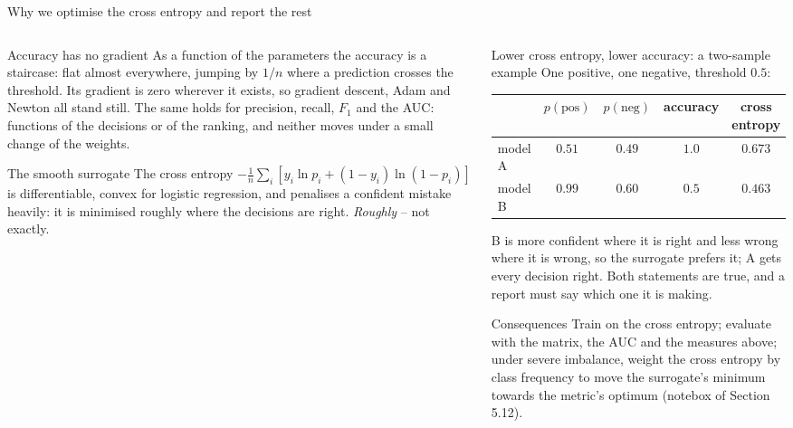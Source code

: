 \documentclass[10pt,aspectratio=169]{beamer}
\begin{document}
\begin{frame}{Why we optimise the cross entropy and report the rest}
\small
\begin{columns}[T]
\begin{column}{0.5\textwidth}
\begin{block}{Accuracy has no gradient}
\scriptsize
As a function of the parameters the accuracy is a staircase: flat almost
everywhere, jumping by $1/n$ where a prediction crosses the threshold.
Its gradient is zero wherever it exists, so gradient descent, Adam and
Newton all stand still.  The same holds for precision, recall, $F_1$ and
the AUC: functions of the decisions or of the ranking, and neither moves
under a small change of the weights.
\end{block}
\begin{block}{The smooth surrogate}
\scriptsize
The cross entropy $-\frac1n\sum_i[y_i\ln p_i+(1-y_i)\ln(1-p_i)]$ is
differentiable, convex for logistic regression, and penalises a confident
mistake heavily: it is minimised roughly where the decisions are right.
\emph{Roughly} -- not exactly.
\end{block}
\end{column}
\begin{column}{0.48\textwidth}
\begin{block}{Lower cross entropy, lower accuracy: a two-sample example}
\scriptsize
One positive, one negative, threshold $0.5$:
\begin{center}
\setlength{\tabcolsep}{4pt}
\begin{tabular}{@{}lcccc@{}}
\toprule
 & $p(\text{pos})$ & $p(\text{neg})$ & accuracy & cross entropy\\
\midrule
model A & $0.51$ & $0.49$ & $1.0$ & $0.673$\\
model B & $0.99$ & $0.60$ & $0.5$ & $0.463$\\
\bottomrule
\end{tabular}
\end{center}
B is more confident where it is right and less wrong where it is wrong,
so the surrogate prefers it; A gets every decision right.  Both statements
are true, and a report must say which one it is making.
\end{block}
\begin{block}{Consequences}
\scriptsize
Train on the cross entropy; evaluate with the matrix, the AUC and the
measures above; under severe imbalance, weight the cross entropy by class
frequency to move the surrogate's minimum towards the metric's optimum
(notebox of Section 5.12).
\end{block}
\end{column}
\end{columns}
\end{frame}
\end{document}
